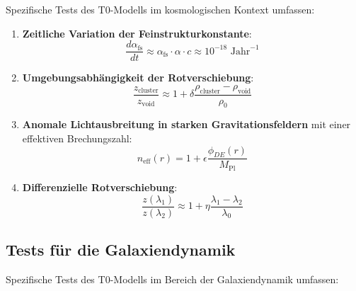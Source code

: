 \documentclass[a4paper,12pt]{article}
\theoremstyle{definition}
\theoremstyle{remark}
\begin{document}
	Spezifische Tests des T0-Modells im kosmologischen Kontext umfassen:
	
	\begin{enumerate}
		\item \textbf{Zeitliche Variation der Feinstrukturkonstante}:
		\begin{equation}
			\frac{d\alpha_{\text{fs}}}{dt} \approx \alpha_{\text{fs}} \cdot \alpha \cdot c \approx 10^{-18} \text{ Jahr}^{-1}
		\end{equation}
		
		\item \textbf{Umgebungsabhängigkeit der Rotverschiebung}:
		\begin{equation}
			\frac{z_{\text{cluster}}}{z_{\text{void}}} \approx 1 + \delta\frac{\rho_{\text{cluster}} - \rho_{\text{void}}}{\rho_0}
		\end{equation}
		
		\item \textbf{Anomale Lichtausbreitung in starken Gravitationsfeldern} mit einer effektiven Brechungszahl:
		\begin{equation}
			n_{\text{eff}}(r) = 1 + \epsilon \frac{\phi_{DE}(r)}{M_{\text{Pl}}}
		\end{equation}
		
		\item \textbf{Differenzielle Rotverschiebung}:
		\begin{equation}
			\frac{z(\lambda_1)}{z(\lambda_2)} \approx 1 + \eta\frac{\lambda_1 - \lambda_2}{\lambda_0}
		\end{equation}
	\end{enumerate}
	
	\subsection{Tests für die Galaxiendynamik}
	
	Spezifische Tests des T0-Modells im Bereich der Galaxiendynamik umfassen:
	
\end{document}
